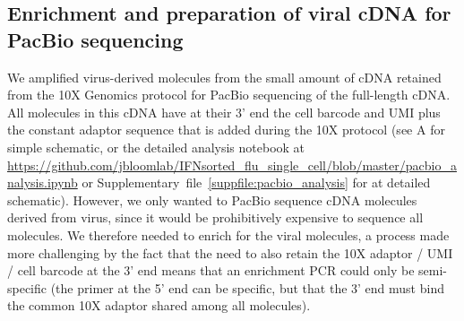 \documentclass[9pt,lineno]{elife}
\begin{document}
\subsection{Enrichment and preparation of viral cDNA for PacBio sequencing}
We amplified virus-derived molecules from the small amount of cDNA retained from the 10X Genomics protocol for PacBio sequencing of the full-length cDNA.
All molecules in this cDNA have at their 3' end the cell barcode and UMI plus the constant adaptor sequence that is added during the 10X protocol (see A for simple schematic, or the detailed analysis notebook at \url{https://github.com/jbloomlab/IFNsorted_flu_single_cell/blob/master/pacbio_analysis.ipynb} or Supplementary~file~\ref{suppfile:pacbio_analysis} for at detailed schematic).
However, we only wanted to PacBio sequence cDNA molecules derived from virus, since it would be prohibitively expensive to sequence all molecules.
We therefore needed to enrich for the viral molecules, a process made more challenging by the fact that the need to also retain the 10X adaptor / UMI / cell barcode at the 3' end means that an enrichment PCR could only be semi-specific (the primer at the 5' end can be specific, but that the 3' end must bind the common 10X adaptor shared among all molecules).
\end{document}
